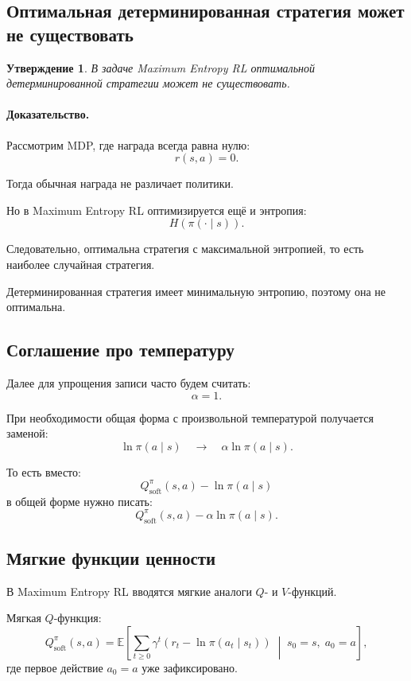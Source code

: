 \documentclass[12pt,a4paper]{article}
\newtheorem{statement}{Утверждение}
\begin{document}
\subsection{Оптимальная детерминированная стратегия может не существовать}

\begin{statement}
В задаче Maximum Entropy RL оптимальной детерминированной стратегии может не существовать.
\end{statement}

\paragraph{Доказательство.}

Рассмотрим MDP, где награда всегда равна нулю:
\[
r(s,a)=0.
\]

Тогда обычная награда не различает политики.

Но в Maximum Entropy RL оптимизируется ещё и энтропия:
\[
H(\pi(\cdot\mid s)).
\]

Следовательно, оптимальна стратегия с максимальной энтропией, то есть наиболее случайная стратегия.

Детерминированная стратегия имеет минимальную энтропию, поэтому она не оптимальна.

\subsection{Соглашение про температуру}

Далее для упрощения записи часто будем считать:
\[
\alpha=1.
\]

При необходимости общая форма с произвольной температурой получается заменой:
\[
\ln \pi(a\mid s)
\quad
\longrightarrow
\quad
\alpha\ln \pi(a\mid s).
\]

То есть вместо:
\[
Q_{\mathrm{soft}}^\pi(s,a)-\ln\pi(a\mid s)
\]
в общей форме нужно писать:
\[
Q_{\mathrm{soft}}^\pi(s,a)-\alpha\ln\pi(a\mid s).
\]

\subsection{Мягкие функции ценности}

В Maximum Entropy RL вводятся мягкие аналоги $Q$- и $V$-функций.

Мягкая $Q$-функция:
\[
Q^\pi_{\mathrm{soft}}(s,a)
=
\mathbb E
\left[
\sum_{t\ge 0}
\gamma^t
\left(
r_t-\ln\pi(a_t\mid s_t)
\right)
\;\middle|\;
s_0=s,\;a_0=a
\right],
\]
где первое действие $a_0=a$ уже зафиксировано.
\end{document}
